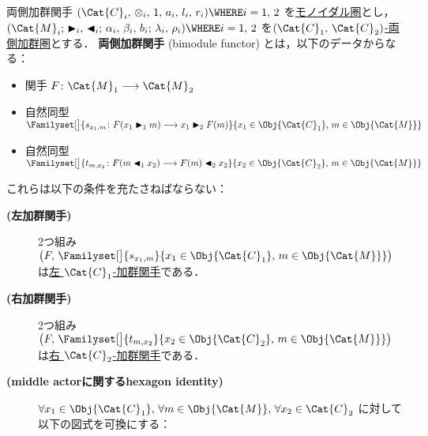 \documentclass[TQFT_main]{subfiles}
\begin{document}
\begin{mydef}[label=def:bimod-functor,breakable]{両側加群関手}
    $(\Cat{C}_i,\, \otimes_i,\, 1,\, a_i,\, l_i,\, r_i) \WHERE i =1,\, 2$ を\hyperref[redef:monoidal-category]{モノイダル圏}とし，
    $(\Cat{M}_i;\, \btr_i,\, \btl_i;\, \alpha_i,\, \beta_i,\, b_i;\, \lambda_i,\, \rho_i) \WHERE i =1,\, 2$ を\hyperref[def:bimodulecat]{$(\Cat{C}_1,\, \Cat{C}_2)$-両側加群圏}とする．
    \textbf{両側加群関手} (bimodule functor) とは，以下のデータからなる：
    \begin{itemize}
        \item 関手 $F \colon \Cat{M}_1 \lto \Cat{M}_2$
        \item 自然同型 $\Familyset[\big]{s_{x_1,m} \colon F(x_1 \btr_1 m) \lto x_1 \btr_2 F(m)}{x_1 \in \Obj{\Cat{C}_1},\, m \in \Obj{\Cat{M}}}$
        \item 自然同型 $\Familyset[\big]{t_{m,x_2} \colon F(m \btl_1 x_2) \lto F(m) \btl_2 x_2}{x_2 \in \Obj{\Cat{C}_2},\, m \in \Obj{\Cat{M}}}$
    \end{itemize}
    これらは以下の条件を充たさねばならない：
    \begin{description}
        \item[\textbf{(左加群関手)}] 2つ組み $\bigl(F,\, \Familyset[\big]{s_{x_1,m}}{x_1 \in \Obj{\Cat{C}_1},\, m \in \Obj{\Cat{M}}}\bigr)$ は\hyperref[def:module-functor]{左 $\Cat{C}_1$-加群関手}である．
        \item[\textbf{(右加群関手)}] 2つ組み $\bigl(F,\, \Familyset[\big]{t_{m,x_2}}{x_2 \in \Obj{\Cat{C}_2},\, m \in \Obj{\Cat{M}}}\bigr)$ は\hyperref[def:module-functor]{右 $\Cat{C}_2$-加群関手}である．
        \item[\textbf{(middle actorに関するhexagon identity)}]
        $\forall x_1 \in \Obj{\Cat{C}_1},\, \forall m \in \Obj{\Cat{M}},\, \forall x_2 \in \Cat{C}_2$ に対して以下の図式を可換にする：
        \begin{center}
            \begin{tikzcd}

\end{tikzcd}
\end{center}
\end{description}
\end{mydef}
\end{document}
